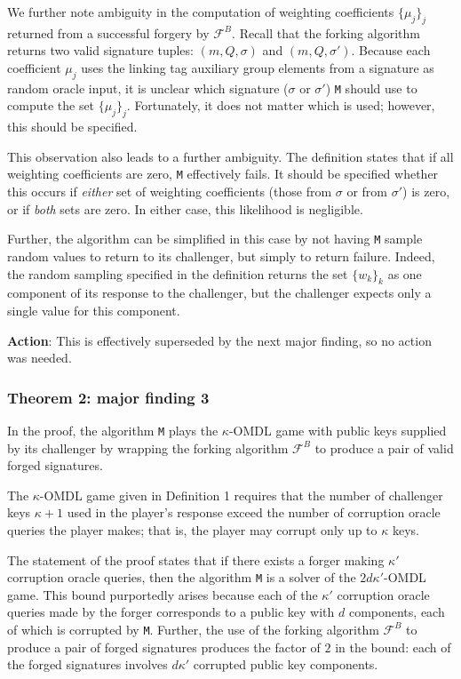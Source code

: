 \documentclass{article}
\begin{document}
We further note ambiguity in the computation of weighting coefficients $\{\mu_j\}_j$ returned from a successful forgery by $\mathcal{F}^B$.
Recall that the forking algorithm returns two valid signature tuples: $(m, Q, \sigma)$ and $(m, Q, \sigma')$.
Because each coefficient $\mu_j$ uses the linking tag auxiliary group elements from a signature as random oracle input, it is unclear which signature ($\sigma$ or $\sigma'$) \texttt{M} should use to compute the set $\{\mu_j\}_j$.
Fortunately, it does not matter which is used; however, this should be specified.

This observation also leads to a further ambiguity.
The definition states that if all weighting coefficients are zero, \texttt{M} effectively fails.
It should be specified whether this occurs if \textit{either} set of weighting coefficients (those from $\sigma$ or from $\sigma'$) is zero, or if \textit{both} sets are zero.
In either case, this likelihood is negligible.

Further, the algorithm can be simplified in this case by not having \texttt{M} sample random values to return to its challenger, but simply to return failure.
Indeed, the random sampling specified in the definition returns the set $\{w_k\}_k$ as one component of its response to the challenger, but the challenger expects only a single value for this component.

\textbf{Action}: This is effectively superseded by the next major finding, so no action was needed.


\subsubsection{Theorem 2: major finding 3}

In the proof, the algorithm \texttt{M} plays the $\kappa$-OMDL game with public keys supplied by its challenger by wrapping the forking algorithm $\mathcal{F}^B$ to produce a pair of valid forged signatures.

The $\kappa$-OMDL game given in Definition 1 requires that the number of challenger keys $\kappa + 1$ used in the player's response exceed the number of corruption oracle queries the player makes; that is, the player may corrupt only up to $\kappa$ keys.

The statement of the proof states that if there exists a forger making $\kappa'$ corruption oracle queries, then the algorithm \texttt{M} is a solver of the $2d\kappa'$-OMDL game.
This bound purportedly arises because each of the $\kappa'$ corruption oracle queries made by the forger corresponds to a public key with $d$ components, each of which is corrupted by \texttt{M}.
Further, the use of the forking algorithm $\mathcal{F}^B$ to produce a pair of forged signatures produces the factor of $2$ in the bound: each of the forged signatures involves $d\kappa'$ corrupted public key components.
\end{document}
